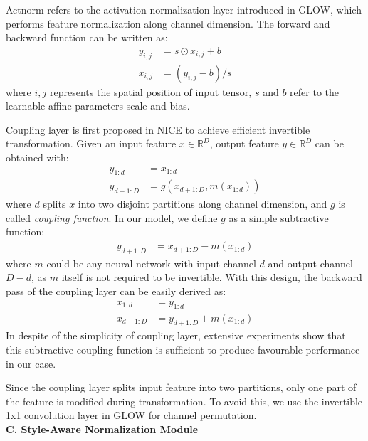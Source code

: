 \documentclass[runningheads]{llncs}
\begin{document}
Actnorm refers to the activation normalization layer introduced in GLOW\cite{kingma2018glow}, which performs feature normalization along channel dimension. The forward and backward function can be written as:
\begin{align}
      y_{i,j} &= s\odot x_{i,j} + b\\
      x_{i,j} &= (y_{i,j} - b) / s
\end{align}
where $i,j$ represents the spatial position of input tensor, $s$ and $b$ refer to the learnable affine parameters scale and bias.


Coupling layer is first proposed in NICE\cite{dinh2014nice} to achieve efficient invertible transformation. Given an input feature $x\in \mathbb{R}^D$, output feature $y\in \mathbb{R}^D$ can be obtained with:
\begin{align}
      y_{1:d} &= x_{1:d}\\
      y_{d+1:D} &= g(x_{d+1:D}, m(x_{1:d}))
\end{align}
where $d$ splits $x$ into two disjoint partitions along channel dimension, and $g$ is called \textit{coupling function}. 
In our model, we define $g$ as a simple subtractive function:
\begin{align}
      y_{d+1:D} &= x_{d+1:D} - m(x_{1:d})
\end{align}
where $m$ could be any neural network with input channel $d$ and output channel $D-d$, as $m$ itself is not required to be invertible. With this design, the backward pass of the coupling layer can be easily derived as:
\begin{align}
    x_{1:d} &= y_{1:d}\\
    x_{d+1:D} &= y_{d+1:D} + m(x_{1:d})
\end{align}
In despite of the simplicity of coupling layer, extensive experiments show that this subtractive coupling function is sufficient to produce favourable performance in our case.


Since the coupling layer splits input feature into two partitions, only one part of the feature is modified during transformation. To avoid this, we use the invertible 1x1 convolution layer in GLOW\cite{kingma2018glow} for channel permutation.\\[1ex]
\noindent \textbf{C. Style-Aware Normalization Module}
\end{document}
